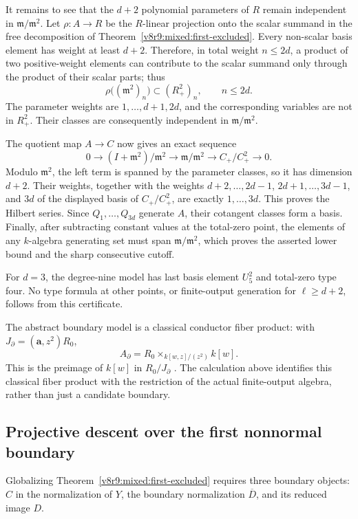\documentclass[10pt,fleqn]{article}
\numberwithin{equation}{section}
\begin{document}
It remains to see that the $d+2$ polynomial parameters of $R$ remain
independent in $\mathfrak m/\mathfrak m^2$.  Let
$\rho:A\to R$ be the $R$-linear projection onto the scalar summand in the
free decomposition of Theorem~\ref{v8r9:mixed:first-excluded}.  Every
non-scalar basis element has weight at least $d+2$.  Therefore, in total
weight $n\le 2d$, a product of two positive-weight elements can contribute
to the scalar summand only through the product of their scalar parts; thus
\[
 \rho\bigl((\mathfrak m^2)_n\bigr)\subset (R_+^2)_n,
 \qquad n\le 2d.
\]
The parameter weights are $1,\ldots,d+1,2d$, and the corresponding
variables are not in $R_+^2$.  Their classes are consequently independent
in $\mathfrak m/\mathfrak m^2$.

The quotient map $A\to C$ now gives an exact sequence
\[
 0\longrightarrow (I+\mathfrak m^2)/\mathfrak m^2
 \longrightarrow \mathfrak m/\mathfrak m^2
 \longrightarrow C_+/C_+^2\longrightarrow0.
\]
Modulo $\mathfrak m^2$, the left term is spanned by the parameter classes,
so it has dimension $d+2$.  Their weights, together with the weights
$d+2,\ldots,2d-1$, $2d+1,\ldots,3d-1$, and $3d$ of the displayed basis of
$C_+/C_+^2$, are exactly $1,\ldots,3d$.  This proves the Hilbert series.
Since $Q_1,\ldots,Q_{3d}$ generate $A$, their cotangent classes form a
basis.  Finally, after subtracting constant values at the total-zero point,
the elements of any $k$-algebra generating set must span
$\mathfrak m/\mathfrak m^2$, which proves the asserted lower bound and the
sharp consecutive cutoff.

For $d=3$, the degree-nine model has last basis element $U_5^2$ and
total-zero type four.  No type formula at other points, or finite-output
generation for $\ell\ge d+2$, follows from this certificate.

The abstract boundary model is a classical conductor fiber product:
with $J_\partial=(\mathbf a,z^2)R_0$,
\[
 A_\partial=R_0\mathbin{\times}_{k[w,z]/(z^2)}k[w].
\]
This is the preimage of $k[w]$ in $R_0/J_\partial$
\cite[Lemma~1.3]{Ferrand}.  The calculation above identifies this
classical fiber product with the restriction of the actual finite-output
algebra, rather than just a candidate boundary.

\subsection{Projective descent over the first nonnormal boundary}

Globalizing Theorem~\ref{v8r9:mixed:first-excluded} requires three
boundary objects: $C$ in the normalization of $Y$, the boundary
normalization $\overline D$, and its reduced image $D$.
\end{document}
